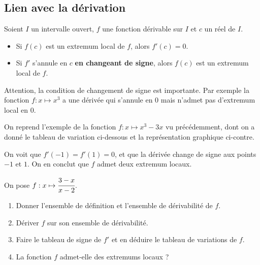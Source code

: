 \documentclass[11pt]{article}
\begin{document}
\subsection{Lien avec la dérivation}
\begin{propadm}
  Soient $I$ un intervalle ouvert, $f$ une fonction dérivable sur $I$ et $c$
  un réel de $I$.
  \begin{itemize}
    \item Si $f(c)$ est un extremum local de $f$, alors $f'(c)=0$.
    \item Si $f'$ s'annule en $c$ \textbf{en changeant de signe}, alors $f(c)$
      est un extremum local de $f$.
  \end{itemize}
\end{propadm}
\begin{rmq}
  Attention, la condition de changement de signe est importante. Par exemple la
  fonction $f:x\mapsto x^3$ a une dérivée qui s'annule en $0$ mais n'admet pas
  d'extremum local en $0$.
\end{rmq}
\begin{exemple}
  \begin{minipage}{.6\textwidth}
    On reprend l'exemple de la fonction $f:x\mapsto x^3-3x$ vu précédemment,
    dont on a donné le tableau de variation ci-dessous et la représentation
    graphique ci-contre.
  \begin{center}
  \end{center}
On voit que $f'(-1)=f'(1)=0$, et que la dérivée change de signe aux points $-1$ et
$1$. On en conclut que $f$ admet deux extremum locaux.
\end{minipage}
\begin{minipage}{.4\textwidth}
  \begin{center}
  \end{center}
\end{minipage}
\end{exemple}

\begin{app}
  On pose $f:x\mapsto\cfrac{3-x}{x-2}$.
  \begin{enumerate}
    \item Donner l'ensemble de définition et l'ensemble de dérivabilité de $f$.
    \item Dériver $f$ sur son ensemble de dérivabilité.
    \item Faire le tableau de signe de $f'$ et en déduire le tableau de
      variations de $f$.
    \item La fonction $f$ admet-elle des extremums locaux ?
  \end{enumerate}
\end{app}
\end{document}
